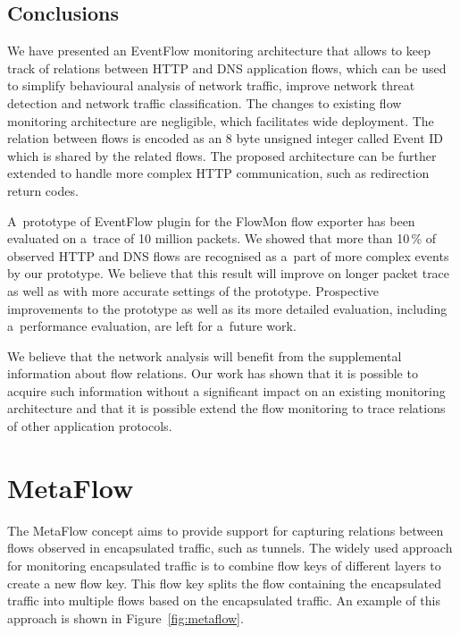 \subsection{Conclusions} \label{subsec:eventflow-conclusions}

We have presented an EventFlow monitoring architecture that allows to keep track of relations between HTTP and DNS application flows, which can be used to simplify behavioural analysis of network traffic, improve network threat detection and network traffic classification. The changes to existing flow monitoring architecture are negligible, which facilitates wide deployment. The relation between flows is encoded as an 8 byte unsigned integer called Event ID which is shared by the related flows. The proposed architecture can be further extended to handle more complex HTTP communication, such as redirection return codes.

A~prototype of EventFlow plugin for the FlowMon flow exporter has been evaluated on a~trace of 10 million packets. We showed that more than 10\,\% of observed HTTP and DNS flows are recognised as a~part of more complex events by our prototype. We believe that this result will improve on longer packet trace as well as with more accurate settings of the prototype. Prospective improvements to the prototype as well as its more detailed evaluation, including a~performance evaluation, are left for a~future work.

We believe that the network analysis will benefit from the supplemental information about flow relations. Our work has shown that it is possible to acquire such information without a significant impact on an existing monitoring architecture and that it is possible extend the flow monitoring to trace relations of other application protocols.


\section{MetaFlow}\label{sec:metaflow}

The MetaFlow concept aims to provide support for capturing relations between flows observed in encapsulated traffic, such as tunnels. The widely used approach for monitoring encapsulated traffic is to combine flow keys of different layers to create a new flow key. This flow key splits the flow containing the encapsulated traffic into multiple flows based on the encapsulated traffic. An example of this approach is shown in Figure~\ref{fig:metaflow}.

